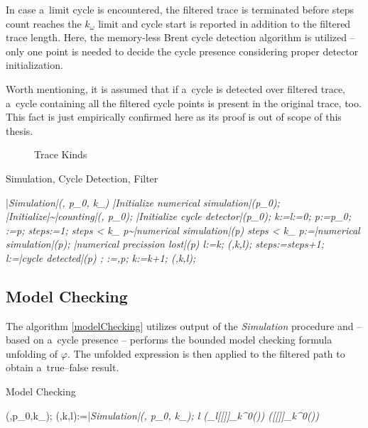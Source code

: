 \documentclass[12pt,oneside,draft]{fithesis}
\begin{document}
In case a~limit cycle is encountered, the filtered trace is terminated
before steps count reaches the $k_{\omega}$ limit and cycle start is
reported in addition to the filtered trace length. Here, the memory-less
Brent cycle detection algorithm is utilized\cite{wloop,brent}
-- only one point is needed to decide the cycle presence considering
proper detector initialization.

Worth mentioning, it is assumed that if a~cycle is detected over
filtered trace, a~cycle containing all the filtered cycle points is
present in the original trace, too. This fact is just empirically
confirmed here as its proof is out of scope of this thesis.

\begin{figure}
\label{fig:trace:kinds}
\caption{Trace Kinds}
\end{figure}


\begin{algorithm}
	\caption{Simulation, Cycle Detection, Filter}
	\label{simulationCycleDetectFilter}
	\begin{program}
			\PROC |\em Simulation\rm|(\varphi, p_0, k_{\omega}) \BODY
			|Initialize numerical simulation|(p_0);
			|Initialize|\sim|counting|(\varphi, p_0);
			|Initialize cycle detector|(p_0);
			k:=l:=0;
			p:=p_0;
			\tilde{\pi}:=p;
			steps:=1;
			\WHILE steps < k_{\omega}
			\DO
				\WHILE p\sim|numerical simulation|(p) \wedge steps < k_{\omega}
				\DO
					p:=|numerical simulation|(p);
					\IF |numerical precission lost|(p)
					\THEN
						l:=k;
						(\tilde{\pi},k,l);
					\FI
					steps:=steps+1;
				\OD
				\IF l:=|cycle detected|(p)
				\THEN
					;
				\FI
				\tilde{\pi}:=\tilde{\pi},p;
				k:=k+1;\rcomment{new representant}
			\OD
			(\tilde{\pi},k,l);
			\ENDPROC
	\end{program}
\end{algorithm}

\subsection*{Model Checking}
The algorithm \ref{modelChecking} utilizes output of the
\emph{Simulation} procedure and -- based on a~cycle presence -- performs
the bounded model checking formula unfolding of $\varphi$. The unfolded
expression is then applied to the filtered path to obtain a~true--false
result.


\begin{algorithm}
	\caption{Model Checking}
	\label{modelChecking}
	\begin{program}
		\:(\varphi,p_0,k_\omega);
		\BEGIN
			(\tilde{\pi},k,l):=|\em Simulation\rm|(\varphi, p_0, k_\omega);
			\IF l \neq 0
			\THEN
				({}_l[[\varphi]]_k^0(\tilde{\pi})) \rcomment{cyclic}
			\ELSE
				([[\varphi]]_k^0(\tilde{\pi})) \rcomment{acyclic}
			\FI
		\END
	\end{program}
\end{algorithm}
\end{document}
